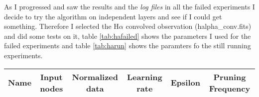 \documentclass[11pt,fleqn]{book} %
\begin{document}
																																																																																																																																																																																																																																																    As I progressed and saw the results and the \emph{log files} in all the failed experiments I decide to try the algorithm on independent layers and see if I could get something. Therefore I selected the H$\alpha$ convolved observation (halpha\_conv.fits) and did some tests on it, table \ref{tab:hafailed} shows the parameters I used for the failed experiments and table \ref{tab:harun} shows the paramters fo the still running experiments.

																																																																																																																																																																																																																																																    \begin{table}[h!]
																																																																																																																																																																																																																																																      \centering
																																																																																																																																																																																																																																																          \begin{tabular}{ c c c c c c }
																																																																																																																																																																																																																																																	      \hline\hline
																																																																																																																																																																																																																																																	          
																																																																																																																																																																																																																																																		      Name & Input nodes & Normalized data & Learning rate & Epsilon & Pruning Frequency\\
																																																																																																																																																																																																																																																		          \hline
																																																																																																																																																																																																																																																			      

\end{tabular}
\end{table}
\end{document}

